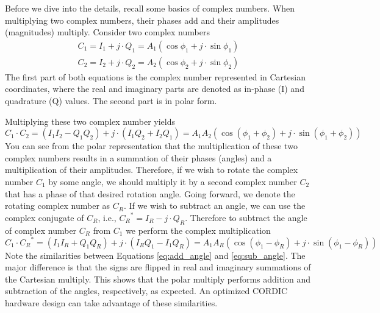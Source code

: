 
Before we dive into the details, recall some basics of complex numbers. When multiplying two complex numbers, their phases add and their amplitudes (magnitudes) multiply. Consider two complex numbers
\begin{equation}
\begin{split} C_1 = I_1 + j \cdot Q_1 = A_1 (\cos \phi_1 + j \cdot \sin \phi_1)  \\
 C_2 = I_2 + j \cdot Q_2 = A_2 (\cos \phi_2 + j \cdot \sin \phi_2)
 \end{split}
\end{equation}
The first part of both equations is the complex number represented in Cartesian coordinates, where the real and imaginary parts are denoted as in-phase (I) and quadrature (Q) values. The second part is in polar form.  

Multiplying these two complex number yields
\begin{equation}
C_1 \cdot C_2 = (I_1 I_2 - Q_1 Q_2) + j \cdot (I_1  Q_2 + I_2  Q_1) = A_1 A_2 (\cos (\phi_1 + \phi_2) + j \cdot \sin(\phi_1 + \phi_2))
\label{eq:add_angle}
\end{equation}
You can see from the polar representation that the multiplication of these two complex numbers results in a summation of their phases (angles) and a multiplication of their amplitudes. Therefore, if we wish to rotate the complex number $C_1$ by some angle, we should multiply it by a second complex number $C_2$ that has a phase of that desired rotation angle. Going forward, we denote the rotating complex number as $C_R$. If we wish to subtract an angle, we can use the complex conjugate of $C_R$, i.e., ${C_R}^{*} = I_R - j \cdot Q_R$. Therefore to subtract the angle of complex number $C_R$ from $C_1$ we perform the complex multiplication
\begin{equation}
C_1 \cdot {C_R}^{*} = (I_1 I_R + Q_1 Q_R) + j \cdot (I_R  Q_1 - I_1  Q_R) = A_1 A_R (\cos (\phi_1 - \phi_R) + j \cdot \sin(\phi_1 - \phi_R))
\label{eq:sub_angle}
\end{equation}
Note the similarities between Equations \ref{eq:add_angle} and \ref{eq:sub_angle}. The major difference is that the signs are flipped in real and imaginary summations of the Cartesian multiply. This shows that the polar multiply performs addition and subtraction of the angles, respectively, as expected. An optimized CORDIC hardware design can take advantage of these similarities. 

